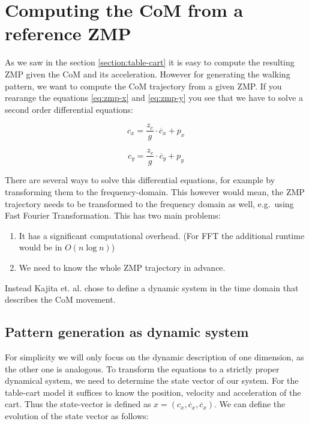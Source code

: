 \documentclass[english,ngerman]{KITreprt}
\newcommand{\clr}[2]{{\color{#1}{#2}}}
\newcommand{\todo}[1]{\marginpar{\clr{red}{#1}}}
\begin{document}
\section{Computing the CoM from a reference
ZMP}\label{computing-the-com-from-a-reference-zmp}

As we saw in the section \ref{section:table-cart} it is easy to compute
the resulting ZMP given the CoM and its acceleration. However for
generating the walking pattern, we want to compute the CoM trajectory
from a given ZMP. If you rearange the equations \ref{eq:zmp-x} and
\ref{eq:zmp-y} you see that we have to solve a second order differential
equations:

\begin{equation} \label{eq:com-x}
c_x = \frac{z_c}{g} \cdot \ddot{c_x} + p_x
\end{equation}

\begin{equation} \label{eq:com-y}
c_y = \frac{z_c}{g} \cdot \ddot{c_y} + p_y
\end{equation}

There are several ways to solve this differential equations, for example
by transforming them to the frequency-domain. This however would mean,
the ZMP trajectory needs to be transformed to the frequency domain as
well, e.g.~using Fast Fourier Transformation. This has two main
problems:

\begin{enumerate}
\def\labelenumi{\arabic{enumi}.}
\item
  It has a significant computational overhead. (For FFT the additional
  runtime would be in $O(n \log n)$)
\item
  We need to know the whole ZMP trajectory in advance.
\end{enumerate}

Instead Kajita et. al. chose to define a dynamic system in the time
domain that describes the CoM movement.

\subsection{Pattern generation as dynamic
system}\label{pattern-generation-as-dynamic-system}

\todo{maybe do a formal introduction into dynamic system and the state space approach}

For simplicity we will only focus on the dynamic description of one
dimension, as the other one is analogous. To transform the equations to
a strictly proper dynamical system, we need to determine the state
vector of our system. For the table-cart model it suffices to know the
position, velocity and acceleration of the cart. Thus the state-vector
is defined as $x = (c_x, \dot{c_x}, \ddot{c_x})$. We can define the
evolution of the state vector as follows:
\end{document}
